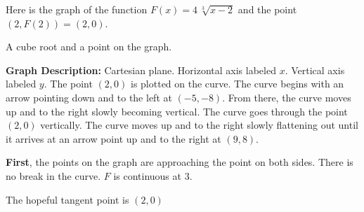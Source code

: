 \documentclass{ximera}
\begin{document}
Here is the graph of the function $F(x) = 4 \, \sqrt[3]{x-2}$ and the point $(2, F(2))= (2, 0)$. 


A cube root and a point on the graph. 




\begin{image}
\end{image}

\textcolor{gray!90}{\textbf{Graph Description:} Cartesian plane. Horizontal axis labeled $x$. Vertical axis labeled $y$. The point $(2,0)$ is plotted on the curve.  The curve begins with an arrow pointing down and to the left at $(-5,-8)$. From there, the curve moves up and to the right slowly becoming vertical. The curve goes through the point $(2,0)$ vertically. The curve moves up and to the right slowly flattening out until it arrives at an arrow point up and to the right at $(9,8)$.}












\textbf{First}, the points on the graph are approaching the point on both sides.  There is no break in the curve. $F$ is continuous at $3$.


The hopeful tangent point is $(2, 0)$ 
\end{document}

